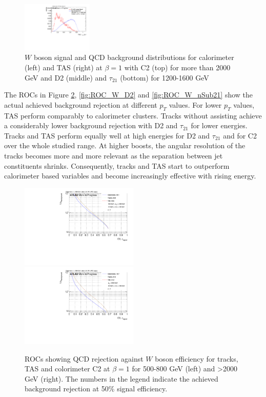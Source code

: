 \begin{figure}[htp]
\includegraphics[width=0.3\textwidth]{sascha_input/plots/W/Beta1/h_assisted_tj_nSub21_bin5.pdf}
\caption{\footnotesize{$W$ boson signal and QCD background distributions for calorimeter (left) and TAS (right) at $\beta=1$  with C2 (top) for more than 2000 GeV and D2 (middle) and $\tau_{21}$ (bottom) for 1200-1600 GeV}}\label{fig:w_distribution_example}
\end{figure}

The ROCs in Figure \ref{fig:ROC_W_C2}, \ref{fig:ROC_W_D2} and \ref{fig:ROC_W_nSub21} show the actual achieved background rejection at different $p_T$ values. For lower $p_T$ values, TAS perform comparably to calorimeter clusters. Tracks without assisting achieve a considerably lower background rejection with D2 and $\tau_{21}$ for lower energies. Tracks and TAS perform equally well at high energies for D2 and $\tau_{21}$ and for C2 over the whole studied range. At higher boosts, the angular resolution of the tracks becomes more and more relevant as the separation between jet constituents shrinks. Consequently, tracks and TAS start to outperform calorimeter based variables and become increasingly effective with rising energy. 
\begin{figure}[htp]
\includegraphics[width=0.5\textwidth]{sascha_input/plots/W/beta1/ROC_ALL_h_recoJet_C2_bin2.pdf} \hspace{1mm}
\includegraphics[width=0.5\textwidth]{sascha_input/plots/W/beta1/ROC_ALL_h_recoJet_C2_bin6.pdf}
\caption{\footnotesize{ROCs showing QCD rejection against $W$ boson efficiency for tracks, TAS and colorimeter C2 at $\beta=1$ for 500-800 GeV (left) and >2000 GeV (right). The numbers in the legend indicate the achieved background rejection at 50\% signal efficiency.}}\label{fig:ROC_W_C2}
\end{figure}

